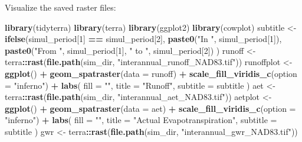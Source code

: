 \documentclass[
]{book}
\newenvironment{Shaded}{\begin{snugshade}}{\end{snugshade}}
\newcommand{\AttributeTok}[1]{\textcolor[rgb]{0.13,0.29,0.53}{#1}}
\newcommand{\DecValTok}[1]{\textcolor[rgb]{0.00,0.00,0.81}{#1}}
\newcommand{\FunctionTok}[1]{\textcolor[rgb]{0.13,0.29,0.53}{\textbf{#1}}}
\newcommand{\NormalTok}[1]{#1}
\newcommand{\OtherTok}[1]{\textcolor[rgb]{0.56,0.35,0.01}{#1}}
\newcommand{\SpecialCharTok}[1]{\textcolor[rgb]{0.81,0.36,0.00}{\textbf{#1}}}
\newcommand{\StringTok}[1]{\textcolor[rgb]{0.31,0.60,0.02}{#1}}
\begin{document}
Visualize the saved raster files:

\begin{Shaded}
\begin{Highlighting}[]
\FunctionTok{library}\NormalTok{(tidyterra)}
\FunctionTok{library}\NormalTok{(terra)}
\FunctionTok{library}\NormalTok{(ggplot2)}
\FunctionTok{library}\NormalTok{(cowplot)}
\NormalTok{subtitle }\OtherTok{\textless{}{-}} \FunctionTok{ifelse}\NormalTok{(simul\_period[}\DecValTok{1}\NormalTok{] }\SpecialCharTok{==}\NormalTok{ simul\_period[}\DecValTok{2}\NormalTok{],}
  \FunctionTok{paste0}\NormalTok{(}\StringTok{"In "}\NormalTok{, simul\_period[}\DecValTok{1}\NormalTok{]),}
  \FunctionTok{paste0}\NormalTok{(}\StringTok{"From "}\NormalTok{, simul\_period[}\DecValTok{1}\NormalTok{], }\StringTok{" to "}\NormalTok{, simul\_period[}\DecValTok{2}\NormalTok{])}
\NormalTok{)}
\NormalTok{runoff }\OtherTok{\textless{}{-}}\NormalTok{ terra}\SpecialCharTok{::}\FunctionTok{rast}\NormalTok{(}\FunctionTok{file.path}\NormalTok{(sim\_dir, }\StringTok{"interannual\_runoff\_NAD83.tif"}\NormalTok{))}
\NormalTok{runoffplot }\OtherTok{\textless{}{-}} \FunctionTok{ggplot}\NormalTok{() }\SpecialCharTok{+}
  \FunctionTok{geom\_spatraster}\NormalTok{(}\AttributeTok{data =}\NormalTok{ runoff) }\SpecialCharTok{+}
  \FunctionTok{scale\_fill\_viridis\_c}\NormalTok{(}\AttributeTok{option =} \StringTok{"inferno"}\NormalTok{) }\SpecialCharTok{+}
  \FunctionTok{labs}\NormalTok{(}
    \AttributeTok{fill =} \StringTok{""}\NormalTok{,}
    \AttributeTok{title =} \StringTok{"Runoff"}\NormalTok{,}
    \AttributeTok{subtitle =}\NormalTok{ subtitle}
\NormalTok{  )}
\NormalTok{aet }\OtherTok{\textless{}{-}}\NormalTok{ terra}\SpecialCharTok{::}\FunctionTok{rast}\NormalTok{(}\FunctionTok{file.path}\NormalTok{(sim\_dir, }\StringTok{"interannual\_aet\_NAD83.tif"}\NormalTok{))}
\NormalTok{aetplot }\OtherTok{\textless{}{-}} \FunctionTok{ggplot}\NormalTok{() }\SpecialCharTok{+}
  \FunctionTok{geom\_spatraster}\NormalTok{(}\AttributeTok{data =}\NormalTok{ aet) }\SpecialCharTok{+}
  \FunctionTok{scale\_fill\_viridis\_c}\NormalTok{(}\AttributeTok{option =} \StringTok{"inferno"}\NormalTok{) }\SpecialCharTok{+}
  \FunctionTok{labs}\NormalTok{(}
    \AttributeTok{fill =} \StringTok{""}\NormalTok{,}
    \AttributeTok{title =} \StringTok{"Actual Evapotranspiration"}\NormalTok{,}
    \AttributeTok{subtitle =}\NormalTok{ subtitle}
\NormalTok{  )}
\NormalTok{gwr }\OtherTok{\textless{}{-}}\NormalTok{ terra}\SpecialCharTok{::}\FunctionTok{rast}\NormalTok{(}\FunctionTok{file.path}\NormalTok{(sim\_dir, }\StringTok{"interannual\_gwr\_NAD83.tif"}\NormalTok{))}

\end{Highlighting}
\end{Shaded}
\end{document}
